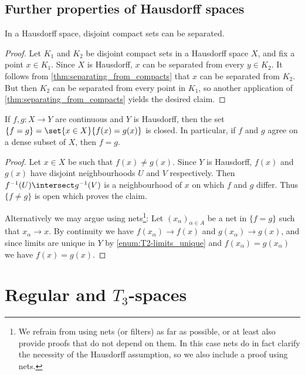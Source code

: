 \documentclass[article, a4paper, 11pt, oneside]{memoir}
\numberwithin{equation}{chapter}
\newcommand{\preim}{^{-1}}
\begin{document}
\section{Further properties of Hausdorff spaces}

\begin{proposition}
    In a Hausdorff space, disjoint compact sets can be separated.
\end{proposition}

\begin{proof}
    Let $K_1$ and $K_2$ be disjoint compact sets in a Hausdorff space $X$, and fix a point $x \in K_1$. Since $X$ is Hausdorff, $x$ can be separated from every $y \in K_2$. It follows from \cref{thm:separating_from_compacts} that $x$ can be separated from $K_2$. But then $K_2$ can be separated from every point in $K_1$, so another application of \cref{thm:separating_from_compacts} yields the desired claim.
\end{proof}


\begin{proposition}
    If $f,g \colon X \to Y$ are continuous and $Y$ is Hausdorff, then the set $\{f = g\} = \set{x \in X}{f(x) = g(x)}$ is closed. In particular, if $f$ and $g$ agree on a dense subset of $X$, then $f = g$.
\end{proposition}

\begin{proof}
    Let $x \in X$ be such that $f(x) \neq g(x)$. Since $Y$ is Hausdorff, $f(x)$ and $g(x)$ have disjoint neighbourhoods $U$ and $V$ respectively. Then $f\preim(U) \intersect g\preim(V)$ is a neighbourhood of $x$ on which $f$ and $g$ differ. Thus $\{f \neq g\}$ is open which proves the claim.

    Alternatively we may argue using nets\footnote{We refrain from using nets (or filters) as far as possible, or at least also provide proofs that do not depend on them. In this case nets do in fact clarify the necessity of the Hausdorff assumption, so we also include a proof using nets.}: Let $(x_\alpha)_{\alpha \in A}$ be a net in $\{f = g\}$ such that $x_\alpha \to x$. By continuity we have $f(x_\alpha) \to f(x)$ and $g(x_\alpha) \to g(x)$, and since limits are unique in $Y$ by \cref{enum:T2-limits_unique} and $f(x_\alpha) = g(x_\alpha)$ we have $f(x) = g(x)$.
\end{proof}



\chapter[Regular and T3-spaces][Regular and $T_3$-spaces]{Regular and $T_3$-spaces}
\end{document}
